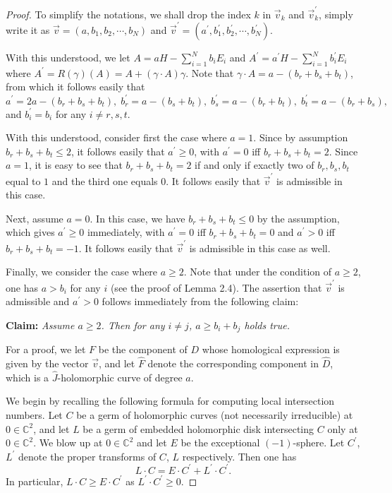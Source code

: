 \documentclass[11pt]{amsart}
\theoremstyle{plain}
\numberwithin{theorem}{section}
\theoremstyle{definition}
\newcommand{\C}{{\mathbb C}}
\begin{document}
\begin{proof}
To simplify the notations, we shall drop the index $k$ in $\vec{v}_k$ and $\vec{v}_k^\prime$, simply write it as 
$\vec{v}=(a,b_{1},b_{2}, \cdots, b_{N})$ and $\vec{v}^\prime=(a^\prime,b_{1}^\prime,b_{2}^\prime, \cdots, 
b_{N}^\prime)$.

With this understood, we let $A=aH-\sum_{i=1}^N b_iE_i$ and $A^\prime=a^\prime H-\sum_{i=1}^N b_i^\prime E_i$
where $A^\prime=R(\gamma)(A)=A+(\gamma\cdot A)\gamma$. Note that 
$\gamma\cdot A=a-(b_r+b_s+b_t)$, from which it follows easily that
$$
a^\prime=2a-(b_r+b_s+b_t), \; b_r^\prime=a-(b_s+b_t), \; b_s^\prime=a-(b_r+b_t), \; b_t^\prime=a-(b_r+b_s),
$$
and $b_i^\prime=b_i$ for any $i\neq r,s,t$.

With this understood, consider first the case where $a=1$. Since by assumption $b_{r}+b_{s}+b_{t}\leq 2$, 
it follows easily that $a^\prime\geq 0$, with $a^\prime= 0$ iff $b_{r}+b_{s}+b_{t}=2$. Since $a=1$, it is easy to see
that $b_{r}+b_{s}+b_{t}=2$ if and only if exactly two of $b_{r}, b_{s},b_{t}$ equal to $1$ and the third one equals $0$. It follows easily that $\vec{v}^\prime$ is admissible in this case. 

Next, assume $a=0$. In this case, we have  $b_{r}+b_{s}+b_{t}\leq 0$ by the assumption, which gives 
$a^\prime\geq 0$ immediately,  with $a^\prime= 0$ iff $b_{r}+b_{s}+b_{t}=0$ and $a^\prime>0$  
iff $b_{r}+b_{s}+b_{t}=-1$. It follows easily that $\vec{v}^\prime$ is admissible in this case as well.

Finally, we consider the case where $a\geq 2$. Note that under the condition of $a\geq 2$, one has $a>b_i$ 
for any $i$ (see the proof of Lemma 2.4). The assertion that $\vec{v}^\prime$ is admissible and $a^\prime>0$
follows immediately from the following claim:

\vspace{1mm}

{\bf Claim:} {\it Assume $a\geq 2$. Then for any $i\neq j$, $a\geq b_{i}+b_{j}$ holds true.}

\vspace{1mm}

For a proof, we let $F$ be the component of $D$ whose homological expression is given by the vector 
$\vec{v}$, and let $\hat{F}$ denote the corresponding component in $\hat{D}$, which is a $\hat{J}$-holomorphic curve of degree $a$. 

We begin by recalling the following formula for computing local intersection numbers. Let $C$ be a germ of holomorphic curves (not necessarily irreducible) at $0\in \C^2$, and let $L$ be a germ of embedded holomorphic disk intersecting $C$ only at $0\in \C^2$. We blow up at $0\in \C^2$ and let $E$ be the exceptional $(-1)$-sphere. Let $C^\prime$, $L^\prime$ denote the proper transforms of $C$, $L$ respectively. Then one has
$$
L\cdot C=E\cdot C^\prime+L^\prime\cdot C^\prime. 
$$
In particular, $L\cdot C\geq E\cdot C^\prime$ as $L^\prime\cdot C^\prime\geq 0$. 


\end{proof}
\end{document}

